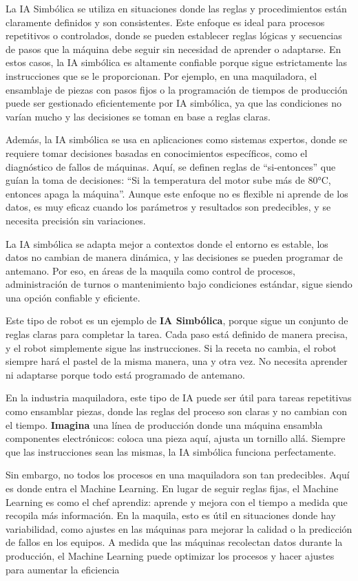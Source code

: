 \documentclass[
  10pt,
  letterpaper,
]{book}
\begin{document}
La IA Simbólica se utiliza en situaciones donde las reglas y
procedimientos están claramente definidos y son consistentes. Este
enfoque es ideal para procesos repetitivos o controlados, donde se
pueden establecer reglas lógicas y secuencias de pasos que la máquina
debe seguir sin necesidad de aprender o adaptarse. En estos casos, la IA
simbólica es altamente confiable porque sigue estrictamente las
instrucciones que se le proporcionan. Por ejemplo, en una maquiladora,
el ensamblaje de piezas con pasos fijos o la programación de tiempos de
producción puede ser gestionado eficientemente por IA simbólica, ya que
las condiciones no varían mucho y las decisiones se toman en base a
reglas claras.

Además, la IA simbólica se usa en aplicaciones como sistemas expertos,
donde se requiere tomar decisiones basadas en conocimientos específicos,
como el diagnóstico de fallos de máquinas. Aquí, se definen reglas de
``si-entonces'' que guían la toma de decisiones: ``Si la temperatura del
motor sube más de 80°C, entonces apaga la máquina''. Aunque este enfoque
no es flexible ni aprende de los datos, es muy eficaz cuando los
parámetros y resultados son predecibles, y se necesita precisión sin
variaciones.

La IA simbólica se adapta mejor a contextos donde el entorno es estable,
los datos no cambian de manera dinámica, y las decisiones se pueden
programar de antemano. Por eso, en áreas de la maquila como control de
procesos, administración de turnos o mantenimiento bajo condiciones
estándar, sigue siendo una opción confiable y eficiente.

Este tipo de robot es un ejemplo de \textbf{IA Simbólica}, porque sigue
un conjunto de reglas claras para completar la tarea. Cada paso está
definido de manera precisa, y el robot simplemente sigue las
instrucciones. Si la receta no cambia, el robot siempre hará el pastel
de la misma manera, una y otra vez. No necesita aprender ni adaptarse
porque todo está programado de antemano.

En la industria maquiladora, este tipo de IA puede ser útil para tareas
repetitivas como ensamblar piezas, donde las reglas del proceso son
claras y no cambian con el tiempo. \textbf{Imagina} una línea de
producción donde una máquina ensambla componentes electrónicos: coloca
una pieza aquí, ajusta un tornillo allá. Siempre que las instrucciones
sean las mismas, la IA simbólica funciona perfectamente.

Sin embargo, no todos los procesos en una maquiladora son tan
predecibles. Aquí es donde entra el Machine Learning. En lugar de seguir
reglas fijas, el Machine Learning es como el chef aprendiz: aprende y
mejora con el tiempo a medida que recopila más información. En la
maquila, esto es útil en situaciones donde hay variabilidad, como
ajustes en las máquinas para mejorar la calidad o la predicción de
fallos en los equipos. A medida que las máquinas recolectan datos
durante la producción, el Machine Learning puede optimizar los procesos
y hacer ajustes para aumentar la eficiencia
\end{document}
